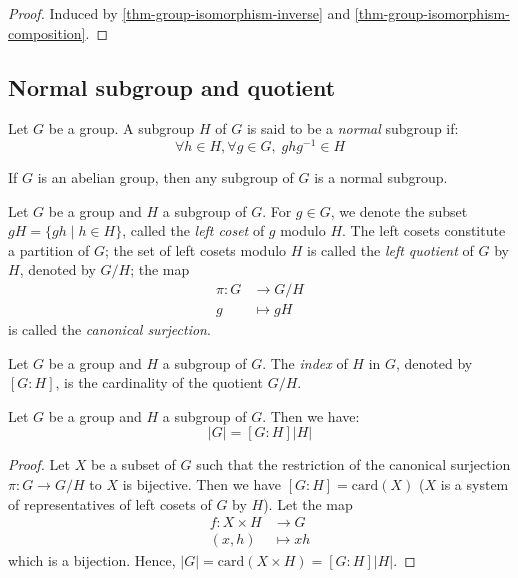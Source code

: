 \documentclass[12pt]{report}
\begin{document}
\begin{proof}
    Induced by \ref{thm-group-isomorphism-inverse} and \ref{thm-group-isomorphism-composition}.
\end{proof}

\subsection{Normal subgroup and quotient}

\begin{definition} \label{def-group-normal-subgroup}
    Let $G$ be a group. A subgroup $H$ of $G$ is said to be a \emph{normal} subgroup if:
    \[
        \forall h \in H, \forall g \in G, \; g h g^{-1} \in H
    \]
\end{definition}

\begin{remark}
    If $G$ is an abelian group, then any subgroup of $G$ is a normal subgroup.
\end{remark}

\begin{definition} \label{def-group-canonical-surjection}
    Let $G$ be a group and $H$ a subgroup of $G$. For $g \in G$, we denote the subset $gH = \lbrace gh \mid h \in H \rbrace$, called the \emph{left coset} of $g$ modulo $H$. The left cosets constitute a partition of $G$; the set of left cosets modulo $H$ is called the \emph{left quotient} of $G$ by $H$, denoted by $G / H$; the map
    \[
        \begin{aligned}
            \pi \colon G &\longrightarrow G / H \\
            g &\longmapsto gH
        \end{aligned}
    \]
    is called the \emph{canonical surjection}.
\end{definition}

\begin{definition} \label{def-group-subgroup-index}
    Let $G$ be a group and $H$ a subgroup of $G$. The \emph{index} of $H$ in $G$, denoted by $[G : H]$, is the cardinality of the quotient $G / H$.
\end{definition}

\begin{proposition}
    Let $G$ be a group and $H$ a subgroup of $G$. Then we have:
    \[
        \lvert G \rvert = [G : H] \lvert H \rvert
    \]
\end{proposition}

\begin{proof}
    Let $X$ be a subset of $G$ such that the restriction of the canonical surjection $\pi \colon G \to G / H$ to $X$ is bijective. Then we have $[G : H] = \text{card}(X)$ ($X$ is a system of representatives of left cosets of $G$ by $H$).
    Let the map
    \[
        \begin{aligned}
            f \colon X \times H &\longrightarrow G \\
            (x, h) &\longmapsto xh
        \end{aligned}
    \]
    which is a bijection. Hence, $\lvert G \rvert = \text{card} (X \times H) = [G : H] \lvert H \rvert$.
\end{proof}
\end{document}
